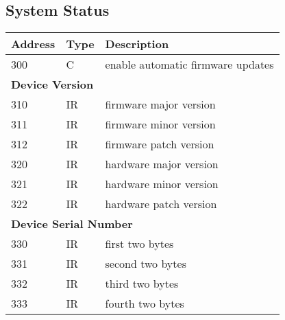 \documentclass[twocolumn,11pt,a4paper]{extarticle}
\begin{document}
\subsection{System Status}
\begin{tabularx}{\columnwidth}{l l X}
	\toprule
	\textbf{Address} & \textbf{Type} & \textbf{Description}\\
	\midrule
	300 & C & enable automatic firmware updates\\
	\midrule
	\multicolumn{3}{l}{\textbf{Device Version}}\\
	\midrule
	310 & IR & firmware major version\\
	311 & IR & firmware minor version\\
	312 & IR & firmware patch version\\
	\midrule
	320 & IR & hardware major version\\
	321 & IR & hardware minor version\\
	322 & IR & hardware patch version\\
	\midrule
	\multicolumn{3}{l}{\textbf{Device Serial Number}}\\
	\midrule
	330 & IR & first two bytes\\
	331 & IR & second two bytes\\
	332 & IR & third two bytes\\
	333 & IR & fourth two bytes\\
	\bottomrule
\end{tabularx}


\printbibliography[heading=bibnumbered]
%
%
\vfill
\end{document}
